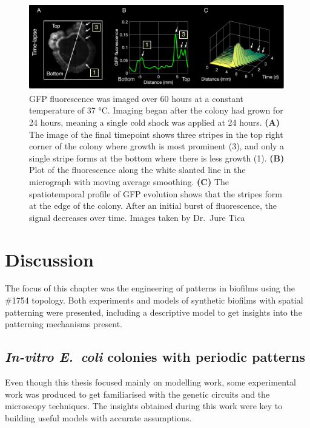 \begin{figure}[H] %
    \centering
    \begin{adjustbox}{center}
        \includegraphics[width=1\textwidth]{chapters/Chapter 3/microscopy_timeseries} %
    \end{adjustbox}
    \caption{GFP fluorescence was imaged over 60 hours at a constant temperature of 37 °C. Imaging began after the colony had grown for 24 hours, meaning a single cold shock was applied at 24 hours. \textbf{(A)} The image of the final timepoint shows three stripes in the top right corner of the colony where growth is most prominent (3), and only a single stripe forms at the bottom where there is less growth (1). \textbf{(B)} Plot of the fluorescence along the white slanted line in the micrograph with moving average smoothing. \textbf{(C)} The spatiotemporal profile of GFP evolution shows that the stripes form at the edge of the colony. After an initial burst of fluorescence, the signal decreases over time. Images taken by Dr.~Jure Tica}
    \label{fig:microscopy_timeseries}
\end{figure}



\section{Discussion}

The focus of this chapter was the engineering of patterns in biofilms using the \#1754 topology.
Both experiments and models of synthetic biofilms with spatial patterning were presented, including a descriptive model to get insights into the patterning mechanisms present.

\subsection{\textit{In-vitro E.~coli} colonies with periodic patterns}
Even though this thesis focused mainly on modelling work, some experimental work was produced to get familiarised with the genetic circuits and the microscopy techniques.
The insights obtained during this work were key to building useful models with accurate assumptions.

